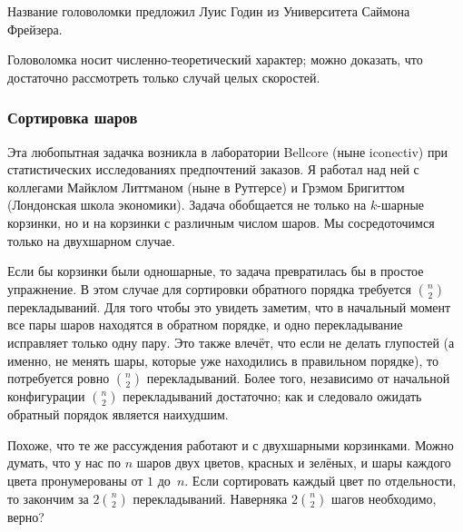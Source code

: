 \medskip

Название головоломки предложил Луис Годин из Университета Саймона Фрейзера.

Головоломка носит численно-теоретический характер;
можно доказать, что достаточно рассмотреть только случай целых скоростей.

\subsubsection*{Сортировка шаров}

Эта любопытная задачка возникла в лаборатории Bellcore (ныне iconectiv) при статистических исследованиях предпочтений заказов.
Я работал над ней с коллегами Майклом Литтманом (ныне в Рутгерсе) и Грэмом Бригиттом (Лондонская школа экономики).
Задача обобщается не только на $k$-шарные корзинки, но и на корзинки с различным числом шаров.
Мы сосредоточимся только на двухшарном случае.

\medskip

Если бы корзинки были одношарные, то задача превратилась бы в простое упражнение.
В этом случае для сортировки обратного порядка требуется $\binom{n}{2}$ перекладываний.
Для того чтобы это увидеть заметим, что в начальный момент все пары шаров находятся в обратном порядке, и одно перекладывание исправляет только одну пару.
Это также влечёт, что если не делать глупостей (а именно, не менять шары, которые уже находились в правильном порядке), то потребуется ровно $\binom{n}{2}$ перекладываний.
Более того, независимо от начальной конфигурации $\binom{n}{2}$ перекладываний достаточно; как и следовало ожидать обратный порядок является наихудшим.

\medskip

Похоже, что те же рассуждения работают и с двухшарными корзинками.
Можно думать, что у нас по $n$ шаров двух цветов, красных и зелёных, и шары каждого цвета пронумерованы от $1$ до~$n$.
Если сортировать каждый цвет по отдельности, то закончим за $2\binom{n}{2}$ перекладываний.
Наверняка $2\binom{n}{2}$ шагов необходимо, верно?

